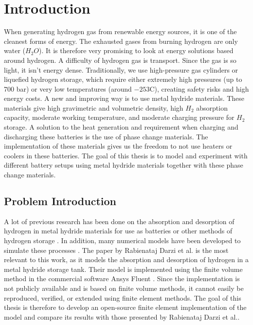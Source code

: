 \section{Introduction}

When generating hydrogen gas from renewable energy sources, it is one of the cleanest forms of energy. The exhausted gases from burning hydrogen are only water ($H_2O$). It is therefore very promising to look at energy solutions based around hydrogen. A difficulty of hydrogen gas is transport. Since the gas is so light, it isn't energy dense. Traditionally, we use high-pressure gas cylinders or liquefied hydrogen storage, which require either extremely high pressures (up to 700 bar) or very low temperatures (around $-253$C), creating safety risks and high energy costs\cite{doe_hydrogen_storage}. A new and improving way is to use metal hydride materials. These materials give high gravimetric and volumetric density, high $H_2$ absorption capacity, moderate working temperature, and moderate charging pressure for $H_2$ storage. A solution to the heat generation and requirement when charging and discharging these batteries is the use of phase change materials. The implementation of these materials gives us the freedom to not use heaters or coolers in these batteries. The goal of this thesis is to model and experiment with different battery setups using metal hydride materials together with these phase change materials.

\subsection{Problem Introduction}

A lot of previous research has been done on the absorption and desorption of hydrogen in metal hydride materials for use as batteries or other methods of hydrogen storage \cite{Nemukula2025}. In addition, many numerical models have been developed to simulate these processes \cite{Sandrock1999}\cite{RabienatajDarzi2016}. The paper by Rabienataj Darzi et al.\cite{RabienatajDarzi2016} is the most relevant to this work, as it models the absorption and desorption of hydrogen in a metal hydride storage tank. Their model is implemented using the finite volume method in the commercial software Ansys Fluent \cite{Fluent}. Since the implementation is not publicly available and is based on finite volume methods, it cannot easily be reproduced, verified, or extended using finite element methods. The goal of this thesis is therefore to develop an open-source finite element implementation of the model and compare its results with those presented by Rabienataj Darzi et al.\cite{RabienatajDarzi2016}.

